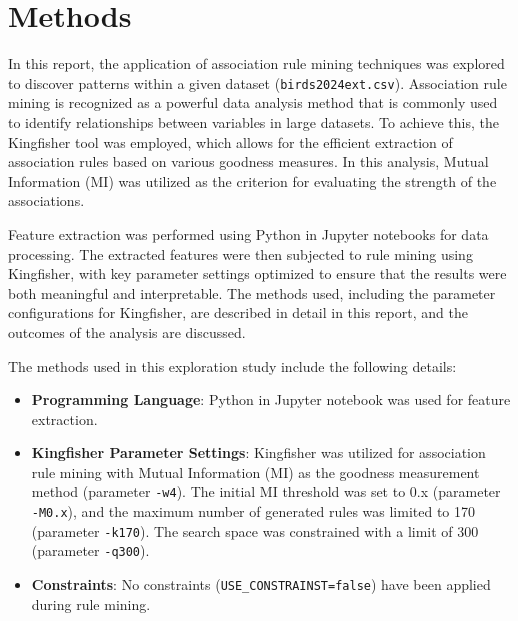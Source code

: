 \section{Methods}

In this report, the application of association rule mining techniques was explored to discover patterns within a given dataset (\texttt{birds2024ext.csv}). Association rule mining is recognized as a powerful data analysis method that is commonly used to identify relationships between variables in large datasets. To achieve this, the Kingfisher tool was employed, which allows for the efficient extraction of association rules based on various goodness measures. In this analysis, Mutual Information (MI) was utilized as the criterion for evaluating the strength of the associations.

Feature extraction was performed using Python in Jupyter notebooks for data processing. The extracted features were then subjected to rule mining using Kingfisher, with key parameter settings optimized to ensure that the results were both meaningful and interpretable. The methods used, including the parameter configurations for Kingfisher, are described in detail in this report, and the outcomes of the analysis are discussed.

The methods used in this exploration study include the following details:

\begin{itemize}

    \item \textbf{Programming Language}: Python in Jupyter notebook was used for feature extraction.

    \item \textbf{Kingfisher Parameter Settings}: Kingfisher was utilized for association rule mining with Mutual Information (MI) as the goodness measurement method (parameter \texttt{-w4}). The initial MI threshold was set to 0.x (parameter \texttt{-M0.x}), and the maximum number of generated rules was limited to 170 (parameter \texttt{-k170}). The search space was constrained with a limit of 300 (parameter \texttt{-q300}).

    \item \textbf{Constraints}: No constraints (\texttt{USE\_CONSTRAINST=false}) have been applied during rule mining.

\end{itemize}
